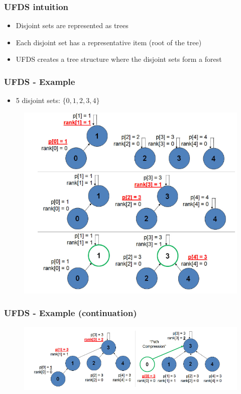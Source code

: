 \documentclass{beamer}
\begin{document}
\begin{frame}[fragile]
\frametitle{UFDS intuition}
	\begin{itemize}
		\item Disjoint sets are represented as trees
	    \item Each disjoint set has a representative item (root of the tree)
	    \item UFDS creates a tree structure where the disjoint sets form a forest
	\end{itemize}
\end{frame}

\begin{frame}[fragile]
\frametitle{UFDS - Example}
	\begin{itemize}
	    \item 5 disjoint sets: $\{0,1,2,3,4\}$
	\end{itemize}
	\begin{figure}
	    \centering
	    \includegraphics[scale=0.3]{imgs/2.4/ufds/example-1.png}
	\end{figure}
\end{frame}

\begin{frame}[fragile]
\frametitle{UFDS - Example (continuation)}
	\begin{figure}
	    \centering
	    \includegraphics[scale=0.4]{imgs/2.4/ufds/example-2.png}
	\end{figure}
\end{frame}
\end{document}
